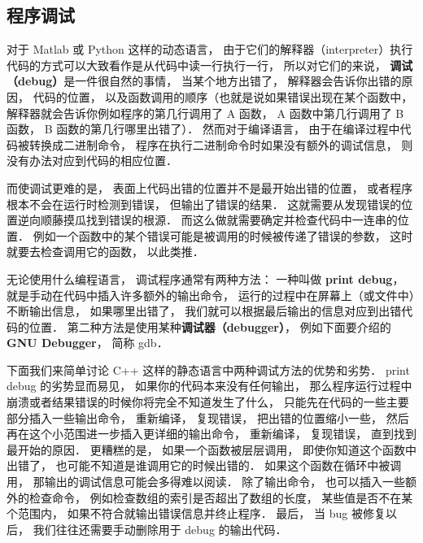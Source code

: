 
\begin{issues}
\issueTODO
{}
\end{issues}

\subsection{程序调试}

对于 Matlab 或 Python 这样的动态语言， 由于它们的解释器（interpreter）执行代码的方式可以大致看作是从代码中读一行执行一行， 所以对它们的来说， \textbf{调试（debug）}是一件很自然的事情， 当某个地方出错了， 解释器会告诉你出错的原因， 代码的位置， 以及函数调用的顺序（也就是说如果错误出现在某个函数中， 解释器就会告诉你例如程序的第几行调用了 A 函数， A 函数中第几行调用了 B 函数， B 函数的第几行哪里出错了）． 然而对于编译语言， 由于在编译过程中代码被转换成二进制命令， 程序在执行二进制命令时如果没有额外的调试信息， 则没有办法对应到代码的相应位置．

而使调试更难的是， 表面上代码出错的位置并不是最开始出错的位置， 或者程序根本不会在运行时检测到错误， 但输出了错误的结果． 这就需要从发现错误的位置逆向顺藤摸瓜找到错误的根源． 而这么做就需要确定并检查代码中一连串的位置． 例如一个函数中的某个错误可能是被调用的时候被传递了错误的参数， 这时就要去检查调用它的函数， 以此类推．

无论使用什么编程语言， 调试程序通常有两种方法： 一种叫做 \textbf{print debug}， 就是手动在代码中插入许多额外的输出命令， 运行的过程中在屏幕上（或文件中）不断输出信息， 如果哪里出错了， 我们就可以根据最后输出的信息对应到出错代码的位置． 第二种方法是使用某种\textbf{调试器（debugger）}， 例如下面要介绍的 \textbf{GNU Debugger}， 简称 gdb．

下面我们来简单讨论 C++ 这样的静态语言中两种调试方法的优势和劣势． print debug 的劣势显而易见， 如果你的代码本来没有任何输出， 那么程序运行过程中崩溃或者结果错误的时候你将完全不知道发生了什么， 只能先在代码的一些主要部分插入一些输出命令， 重新编译， 复现错误， 把出错的位置缩小一些， 然后再在这个小范围进一步插入更详细的输出命令， 重新编译， 复现错误， 直到找到最开始的原因． 更糟糕的是， 如果一个函数被层层调用， 即使你知道这个函数中出错了， 也可能不知道是谁调用它的时候出错的． 如果这个函数在循环中被调用， 那输出的调试信息可能会多得难以阅读． 除了输出命令， 也可以插入一些额外的检查命令， 例如检查数组的索引是否超出了数组的长度， 某些值是否不在某个范围内， 如果不符合就输出错误信息并终止程序． 最后， 当 bug 被修复以后， 我们往往还需要手动删除用于 debug 的输出代码．

